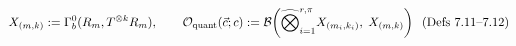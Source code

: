 \documentclass[preview]{standalone}
\begin{document}
\begin{align*}
\special{dvisvgm:raw <g id='unique000'>}X_{(m,k)} := \Gamma_b^0(R_m, T^{\otimes k}R_m), \qquad \mathcal{O}_{\text{quant}}(\vec{c}; c) := \mathcal{B}\!\left(\widehat{\bigotimes}_{i=1}^{r,\pi} X_{(m_i,k_i)},\; X_{(m,k)}\right)\;\;(\text{Defs 7.11--7.12})\special{dvisvgm:raw </g>}
\end{align*}
\end{document}
